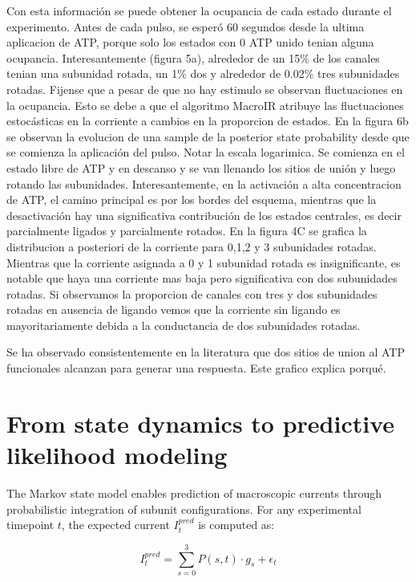 \documentclass[pdflatex,sn-mathphys-num]{sn-jnl}%
\theoremstyle{thmstyleone}%
\theoremstyle{thmstyletwo}%
\theoremstyle{thmstylethree}%
\begin{document}
Con esta información se puede obtener la ocupancia de cada estado durante el experimento. Antes de cada pulso, se esperó 60 segundos desde la ultima aplicacion de ATP, porque solo los estados con 0 ATP unido tenian alguna ocupancia. Interesantemente (figura 5a), alrededor de un 15\% de los canales tenian una subunidad rotada, un 1\% dos y alrededor de 0.02\% tres subunidades rotadas. Fijense que a pesar de que no hay estimulo se observan fluctuaciones en la ocupancia. Esto se debe a que el algoritmo MacroIR atribuye las fluctuaciones estocásticas en la corriente a cambios en la proporcion de estados. 
En la figura 6b se observan la evolucion de una sample de la  posterior state probability desde que se comienza la aplicación del pulso. Notar la escala logarimica. Se comienza en el estado libre de ATP y en descanso y se van llenando los sitios de unión y luego rotando las subunidades. Interesantemente, en la activación a alta concentracion de ATP, el camino principal  es por los bordes del esquema, mientras que la desactivación hay una significativa contribución de los estados centrales, es decir parcialmente ligados y parcialmente rotados. 
En la figura 4C se grafica la distribucion a posteriori de la corriente para 0,1,2 y 3 subunidades rotadas. Mientras que la corriente asignada a 0 y 1 subunidad rotada es insignificante, es notable que haya una corriente mas baja pero significativa con dos subunidades rotadas. Si observamos la proporcion de canales con tres y dos subunidades rotadas en ausencia de ligando vemos que la corriente sin ligando es mayoritariamente debida a la conductancia de dos subunidades rotadas. 

Se ha observado consistentemente en la literatura que dos sitios de union al ATP funcionales alcanzan para generar una respuesta. Este grafico explica porqué. 


\section{From state dynamics to predictive likelihood modeling}
\label{sec:likelihood}

The Markov state model enables prediction of macroscopic currents through probabilistic integration of subunit configurations. For any experimental timepoint $t$, the expected current $I_t^{pred}$ is computed as:

\begin{equation}
	I_t^{pred} = \sum_{s=0}^3 P(s,t) \cdot g_s + \epsilon_t
\end{equation}
\end{document}
